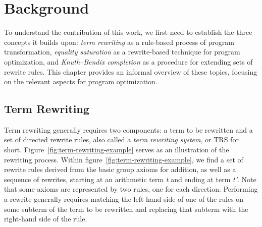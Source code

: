 \chapter{Background}
\label{chap:background}

To understand the contribution of this work, we first need to establish the three concepts it builds upon: \emph{term rewriting} as a rule-based process of program transformation, \emph{equality saturation} as a rewrite-based technique for program optimization, and \emph{Knuth–Bendix completion} as a procedure for extending sets of rewrite rules. This chapter provides an informal overview of these topics, focusing on the relevant aspects for program optimization.

\section{Term Rewriting}
\label{sec:term-rewriting}

Term rewriting generally requires two components: a term to be rewritten and a set of directed rewrite rules, also called a \emph{term rewriting system}, or TRS  for short. Figure~\ref{fig:term-rewriting-example} serves as an illustration of the rewriting process. Within figure~\ref{fig:term-rewriting-example}, we find a set of rewrite rules derived from the basic group axioms for addition, as well as a sequence of rewrites, starting at an arithmetic term \emph{t} and ending at term \emph{t'}. Note that some axioms are represented by two rules, one for each direction. Performing a rewrite generally requires matching the left-hand side of one of the rules on some subterm of the term to be rewritten and replacing that subterm with the right-hand side of the rule.

